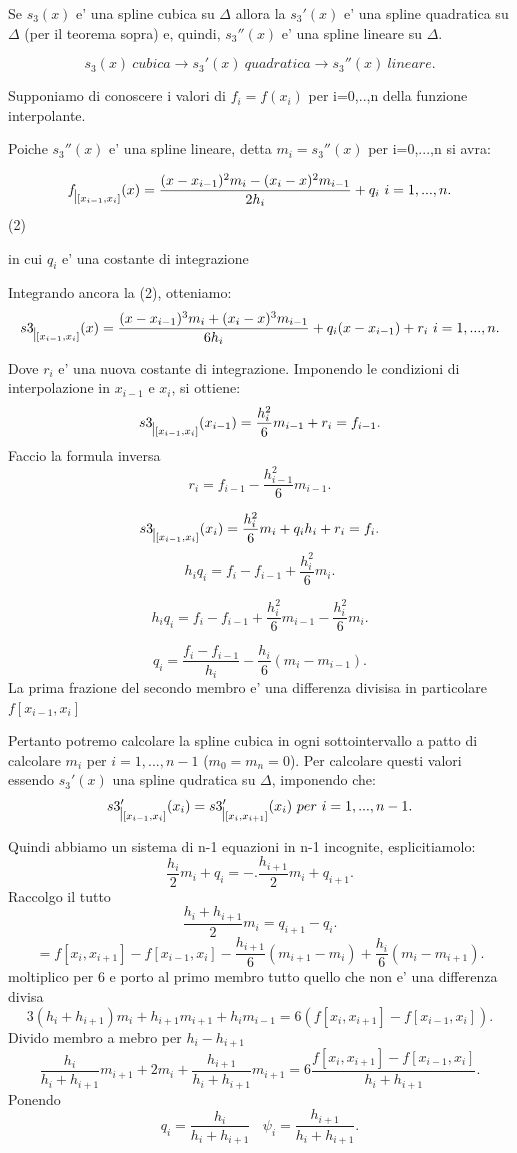 \documentclass[11pt]{article}
\theoremstyle{definition}
\theoremstyle{plain}
\begin{document}
Se $s_3(x)$ e' una spline cubica su $\varDelta$ allora la $s_3'(x)$ e' una spline quadratica su $\varDelta$ (per il teorema sopra) e, quindi, $s_3''(x)$ e' una spline lineare su $\varDelta$.

\[
	s_3(x)\ cubica\to s_3'(x)\ quadratica\to s_3''(x)\ lineare
.\] 

Supponiamo di conoscere i valori di $f_i=f(x_i)$ per i=0,..,n della funzione interpolante.

Poiche $s_3''(x)$ e' una spline lineare, detta $m_i=s_3''(x)$ per i=0,...,n si avra:


\[
	f_{\mkern 1mu \vrule height 2ex\mkern2mu [x_{i-1},x_i]}(x)=\frac{(x-x_{i-1})^{2}m_i-(x_{i}-x)^{2}m_{i-1}}{2h_i}+q_i\ i=1,...,n
.\] 
(2)

in cui $q_i$ e' una costante di integrazione

Integrando ancora la (2), otteniamo:
\[
	s3_{\mkern 1mu \vrule height 2ex\mkern2mu [x_{i-1},x_i]}(x)=\frac{(x-x_{i-1})^{3}m_i+(x_{i}-x)^{3}m_{i-1}}{6h_i}+q_i(x-x_{i-1})+r_i\ i=1,...,n
.\] 

Dove $r_i$ e' una nuova costante di integrazione. Imponendo le condizioni di interpolazione in $x_{i-1}$ e $x_{i}$, si ottiene:
\[
	s3_{\mkern 1mu \vrule height 2ex\mkern2mu [x_{i-1},x_i]}(x_{i-1})=\frac{h_i^{2}}{6}m_{i-1}+r_i=f_{i-1}
.\] 
Faccio la formula inversa
\[
	r_i=f_{i-1}-\frac{h_{i-1}^{2}}{6}m_{i-1}
.\] 

\[
	s3_{\mkern 1mu \vrule height 2ex\mkern2mu [x_{i-1},x_i]}(x_{i})=\frac{h_i^{2}}{6}m_{i}+q_ih_i+r_i=f_{i}
.\] 
\[
	h_iq_i=f_i-f_{i-1}+\frac{h_i^{2}}{6}m_i
.\] 

\[
h_iq_i=f_i-f_{i-1}+\frac{h_i^{2}}{6}m_{i-1}-\frac{h_i^{2}}{6}m_{i}
.\] 

\[
	q_i=\frac{f_i-f_{i-1}}{h_i}-\frac{h_i}{6}(m_i-m_{i-1})
.\] 
La prima frazione del secondo membro e' una differenza divisisa in particolare $f[x_{i-1},x_{i}]$

Pertanto potremo calcolare la spline cubica in ogni sottointervallo a patto di calcolare $m_i$ per $i=1,...,n-1$ ($m_0=m_n=0$). Per calcolare questi valori essendo $s_3'(x)$ una spline qudratica su $\varDelta$, imponendo che:
\[
	s3'_{\mkern 1mu \vrule height 2ex\mkern2mu [x_{i-1},x_i]}(x_{i})=s3'_{\mkern 1mu \vrule height 2ex\mkern2mu [x_{i},x_{i+1}]}(x_{i})\ per\ i=1,...,n-1
.\] 

Quindi abbiamo un sistema di n-1 equazioni in n-1 incognite, esplicitiamolo:
\[
\frac{h_i}{2}m_i+q_i=-.\frac{h_{i+1}}{2}m_i+q_{i+1}
.\] 
Raccolgo il tutto
\[
\frac{h_i+h_{i+1}}{2}m_i=q_{i+1}-q_i
.\] 
\[
	=f[x_{i},x_{i+1}]-f[x_{i-1},x_{i}]-\frac{h_{i+1}}{6}(m_{i+1}-m_i)+\frac{h_i}{6}(m_i-m_{i+1})
.\] 
moltiplico per 6 e porto al primo membro tutto quello che non e' una differenza divisa
\[
	3(h_i+h_{i+1})m_i+h_{i+1}m_{i+1}+h_im_{i-1}=6(f[x_{i},x_{i+1}]-f[x_{i-1},x_{i}])
.\] 
Divido membro a mebro per $h_i-h_{i+1}$
\[
	\frac{h_i}{h_i+h_{i+1}}m_{i+1}+2m_{i}+\frac{h_{i+1}}{h_i+h_{i+1}}m_{i+1}=6 \frac{f[x_{i},x_{i+1}]-f[x_{i-1},x_{i}]}{h_i+h_{i+1}}
.\] 
Ponendo
\[
q_i=\frac{h_i}{h_i+h_{i+1}}\ \ \ \ \psi_i=\frac{h_{i+1}}{h_i+h_{i+1}}
.\] 
\end{document}
